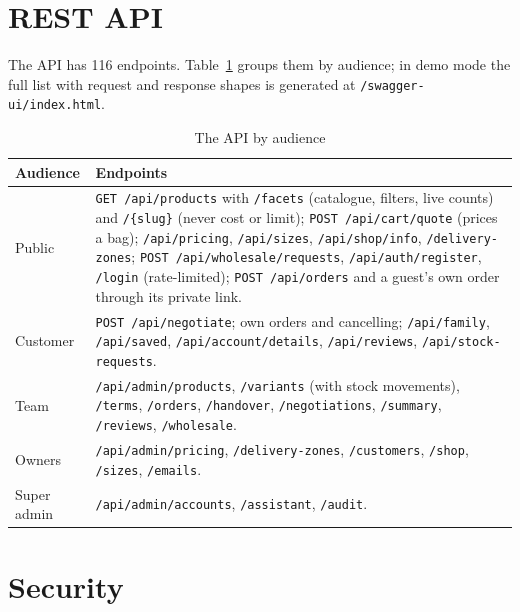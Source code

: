 \section{REST API}

The API has 116 endpoints. Table~\ref{tab:api} groups them by audience; in demo mode the full list with request
and response shapes is generated at \texttt{/swagger-ui/index.html}.

\begin{table}[!htbp]
	\centering\small
	\begin{tabularx}{\textwidth}{p{2.6cm} X}
		\toprule
		\textbf{Audience} & \textbf{Endpoints} \\
		\midrule
		Public & \texttt{GET /api/products} with \texttt{/facets} (catalogue, filters, live counts) and
		\texttt{/\{slug\}} (never cost or limit); \texttt{POST /api/cart/quote} (prices a bag); \texttt{/api/pricing},
		\texttt{/api/sizes}, \texttt{/api/shop/info}, \texttt{/delivery-zones}; \texttt{POST /api/wholesale/requests},
		\texttt{/api/auth/register}, \texttt{/login} (rate-limited); \texttt{POST /api/orders} and a guest's own order
		through its private link. \\
		Customer & \texttt{POST /api/negotiate}; own orders and cancelling; \texttt{/api/family}, \texttt{/api/saved},
		\texttt{/api/account/details}, \texttt{/api/reviews}, \texttt{/api/stock-requests}. \\
		Team & \texttt{/api/admin/products}, \texttt{/variants} (with stock movements), \texttt{/terms},
		\texttt{/orders}, \texttt{/handover}, \texttt{/negotiations}, \texttt{/summary}, \texttt{/reviews},
		\texttt{/wholesale}. \\
		Owners & \texttt{/api/admin/pricing}, \texttt{/delivery-zones}, \texttt{/customers}, \texttt{/shop},
		\texttt{/sizes}, \texttt{/emails}. \\
		Super admin & \texttt{/api/admin/accounts}, \texttt{/assistant}, \texttt{/audit}. \\
		\bottomrule
	\end{tabularx}
	\caption{The API by audience}
	\label{tab:api}
\end{table}

\section{Security}
\label{sec:security}

